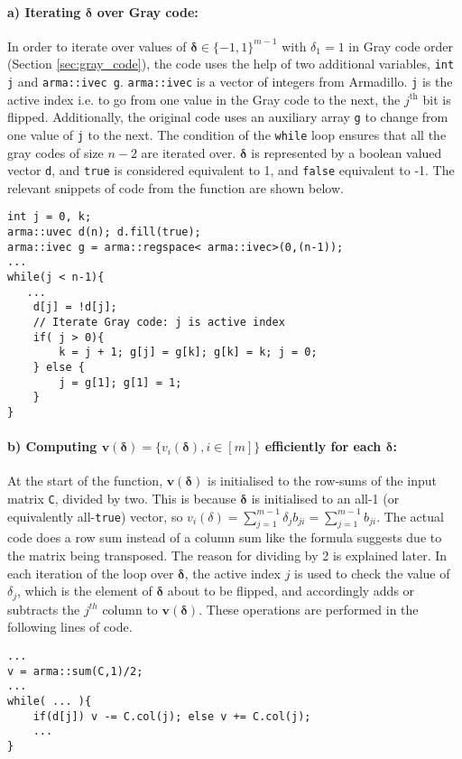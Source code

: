 \documentclass[11pt]{article}
\theoremstyle{theorem}
\theoremstyle{theorem}
\theoremstyle{remark}
\theoremstyle{note}
\theoremstyle{plain}
\theoremstyle{definition}
\begin{document}
\paragraph{a) Iterating $\mathbf{\delta}$ over Gray code:} In order to iterate over values of $\mathbf{\delta} \in \{-1, 1\}^{m-1}$ with $\delta_1 = 1$ in Gray code order (Section \ref{sec:gray_code}), the code uses the help of two additional variables, \texttt{int j} and \texttt{arma::ivec g}. \texttt{arma::ivec} is a vector of integers from Armadillo. \texttt{j} is the active index i.e. to go from one value in the Gray code to the next, the $j^\text{th}$ bit is flipped. Additionally, the original code uses an auxiliary array \texttt{g} to change from one value of  \texttt{j} to the next. The condition of the \texttt{while} loop ensures that all the gray codes of size $n-2$ are iterated over. $\mathbf{\delta}$ is represented by a boolean valued vector \texttt{d}, and \texttt{true} is considered equivalent to 1, and \texttt{false} equivalent to -1.
The relevant snippets of code from the function are shown below.
\begin{verbatim}
int j = 0, k;
arma::uvec d(n); d.fill(true);
arma::ivec g = arma::regspace< arma::ivec>(0,(n-1));
...
while(j < n-1){
   ...
    d[j] = !d[j];
    // Iterate Gray code: j is active index
    if( j > 0){
        k = j + 1; g[j] = g[k]; g[k] = k; j = 0;
    } else {
        j = g[1]; g[1] = 1;
    }
}
\end{verbatim}

\paragraph{b) Computing $\mathbf{v}(\mathbf{\delta}) = \{v_i (\mathbf{\delta}), i \in [m]\}$ efficiently for each $\mathbf{\delta}$:} At the start of the function, $\mathbf{v}(\mathbf{\delta})$ is initialised to the row-sums of the input matrix \texttt{C}, divided by two. This is because $\mathbf{\delta}$ is initialised to an all-1 (or equivalently all-\texttt{true}) vector, so $v_i (\delta) = \sum_{j=1}^{m-1} \delta_j b_{ji} =  \sum_{j=1}^{m-1} b_{ji}$. The actual code does a row sum instead of a column sum like the formula suggests due to the matrix being transposed. The reason for dividing by 2 is explained later. In each iteration of the loop over $\mathbf{\delta}$, the active index $j$ is used to check the value of $\delta_j$, which is the element of $\mathbf{\delta}$ about to be flipped, and accordingly adds or subtracts the $j^{th}$ column to $\mathbf{v}(\mathbf{\delta})$. These operations are performed in the following lines of code.
\begin{verbatim}
...
v = arma::sum(C,1)/2;
...
while( ... ){
    if(d[j]) v -= C.col(j); else v += C.col(j);
    ...
}
\end{verbatim}
\end{document}
